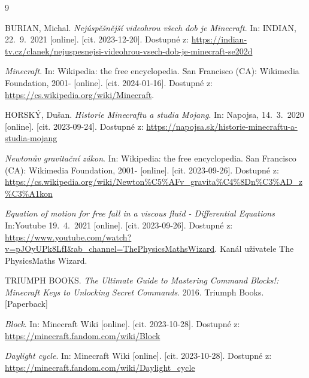 \documentclass[a4paper, twoside]{article}
\begin{document}
\newpage
\renewcommand{\refname}{Použité zdroje}
\begin{thebibliography}{9}%

BURIAN, Michal.\textit{ Nejúspěšnější videohrou všech dob je Minecraft}. In: INDIAN, 22.~9.~2021 [online]. [cit. 2023-12-20]. Dostupné z: \url {https://indian-tv.cz/clanek/nejuspesnejsi-videohrou-vsech-dob-je-minecraft-se202d}

\textit{Minecraft}. In: Wikipedia: the free encyclopedia. San Francisco (CA): Wikimedia Foundation, 2001- [online]. [cit. 2024-01-16]. Dostupné z: \url{https://cs.wikipedia.org/wiki/Minecraft}.

HORSKÝ, Dušan. \textit{Historie Minecraftu a studia Mojang}. In: Napojsa, 14.~3.~2020 [online]. [cit. 2023-09-24]. Dostupné z: \url{https://napojsa.sk/historie-minecraftu-a-studia-mojang}

\textit{Newtonův gravitační zákon}. In: Wikipedia: the free encyclopedia. San Francisco (CA): Wikimedia Foundation, 2001- [online]. [cit. 2023-09-26]. Dostupné z: \url{https://cs.wikipedia.org/wiki/Newton%C5%AFv_gravita%C4%8Dn%C3%AD_z%C3%A1kon}

\textit{Equation of motion for free fall in a viscous fluid - Differential Equations} In:Youtube 19.~4.~2021 [online].  [cit. 2023-09-26]. Dostupné z: \url{https://www.youtube.com/watch?v=pJOyUPk8LfI&ab_channel=ThePhysicsMathsWizard}. Kanál uživatele The PhysicsMaths Wizard. 

TRIUMPH BOOKS. \textit{The Ultimate Guide to Mastering Command Blocks!: Minecraft Keys to Unlocking Secret Commands}. 2016. Triumph Books. [Paperback]

\textit{Block}. In: Minecraft Wiki [online]. [cit. 2023-10-28]. Dostupné z: \url{https://minecraft.fandom.com/wiki/Block}


\textit{Daylight cycle}. In: Minecraft Wiki [online]. [cit. 2023-10-28]. Dostupné z: \url{https://minecraft.fandom.com/wiki/Daylight_cycle}

\end{thebibliography} 

\renewcommand{\indexname}{Rejstřík pojmů}
\printindex
\end{document}
